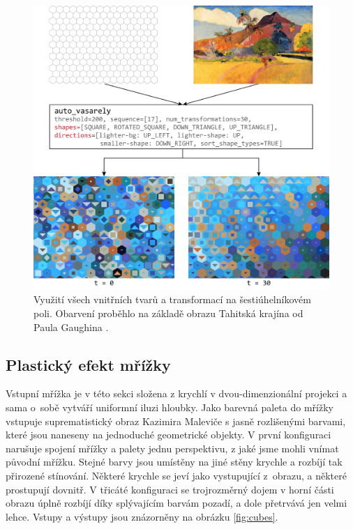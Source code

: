\begin{figure}
    \centering
    \includegraphics[width=\textwidth]{obrazky-figures/hexagons.pdf}
    \caption{Využití všech vnitřních tvarů a transformací na šestiúhelníkovém poli. Obarvení proběhlo na základě obrazu Tahitská krajína od Paula Gaughina \cite{tahiti}. }
    \label{fig:hexagons}
\end{figure}

\subsection*{Plastický efekt mřížky}

Vstupní mřížka je v této sekci složena z krychlí v dvou-dimenzionální projekci a sama o~sobě vytváří uniformní iluzi hloubky. Jako barevná paleta do mřížky vstupuje suprematistický obraz Kazimira Maleviče \cite{suprematism} s jasně rozlišenými barvami, které jsou naneseny na jednoduché geometrické objekty. V první konfiguraci narušuje spojení mřížky a palety jednu perspektivu, z jaké jsme mohli vnímat původní mřížku. Stejné barvy jsou umístěny na jiné stěny krychle a rozbíjí tak přirozené stínování. Některé krychle se jeví jako vystupující z~obrazu, a některé prostupují dovnitř. V třicáté konfiguraci se trojrozměrný dojem v horní části obrazu úplně rozbíjí díky splývajícím barvám pozadí, a dole přetrvává jen velmi lehce. Vstupy a výstupy jsou znázorněny na obrázku \ref{fig:cubes}.

